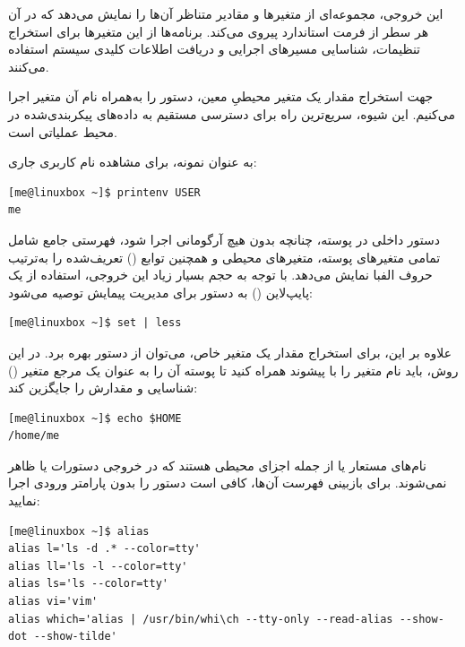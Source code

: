 این خروجی، مجموعه‌ای از متغیرها و مقادیر متناظر آن‌ها را نمایش می‌دهد که در آن هر سطر از فرمت استاندارد  پیروی می‌کند. برنامه‌ها از این متغیرها برای استخراج تنظیمات، شناسایی مسیرهای اجرایی و دریافت اطلاعات کلیدی سیستم استفاده می‌کنند.

جهت استخراج مقدار یک متغیر محیطیِ معین، دستور  را به‌همراه نام آن متغیر اجرا می‌کنیم. این شیوه، سریع‌ترین راه برای دسترسی مستقیم به داده‌های پیکربندی‌شده در محیط عملیاتی است.

به عنوان نمونه، برای مشاهده نام کاربری جاری:

\begin{latin}
\begin{lstlisting}
[me@linuxbox ~]$ printenv USER
me
\end{lstlisting}
\end{latin}

دستور داخلی  در پوسته، چنانچه بدون هیچ آرگومانی اجرا شود، فهرستی جامع شامل تمامی متغیرهای پوسته، متغیرهای محیطی و همچنین توابع () تعریف‌شده را به‌ترتیب حروف الفبا نمایش می‌دهد. با توجه به حجم بسیار زیاد این خروجی، استفاده از یک پایپ‌لاین () به دستور  برای مدیریت پیمایش توصیه می‌شود:

\begin{latin}
\begin{lstlisting}
[me@linuxbox ~]$ set | less
\end{lstlisting}
\end{latin}

علاوه بر این، برای استخراج مقدار یک متغیر خاص، می‌توان از دستور  بهره برد. در این روش، باید نام متغیر را با پیشوند \cmd{\$} همراه کنید تا پوسته آن را به عنوان یک مرجع متغیر () شناسایی و مقدارش را جایگزین کند:

\begin{latin}
\begin{lstlisting}
[me@linuxbox ~]$ echo $HOME
/home/me
\end{lstlisting}
\end{latin}

نام‌های مستعار یا  از جمله اجزای محیطی هستند که در خروجی دستورات  یا  ظاهر نمی‌شوند. برای بازبینی فهرست آن‌ها، کافی است دستور  را بدون پارامتر ورودی اجرا نمایید:

\begin{latin}
\begin{lstlisting}
[me@linuxbox ~]$ alias
alias l='ls -d .* --color=tty'
alias ll='ls -l --color=tty'
alias ls='ls --color=tty'
alias vi='vim'
alias which='alias | /usr/bin/whi\ch --tty-only --read-alias --show-dot --show-tilde'
\end{lstlisting}
\end{latin}


